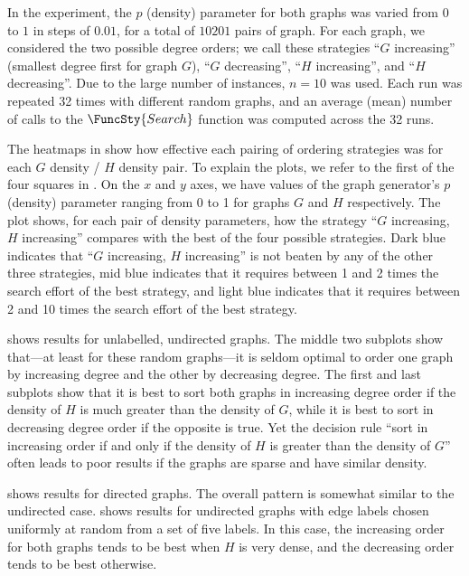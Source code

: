 In the experiment, the $p$ (density) parameter for both graphs was varied from
$0$ to $1$ in steps of $0.01$, for a total of $10201$ pairs of graph.  For each
graph, we considered the two possible degree orders; we call these strategies
``$G$ increasing'' (smallest degree first for graph $G$), ``$G$ decreasing'',
``$H$ increasing'', and ``$H$ decreasing''.  Due to the large number of
instances, $n=10$ was used.  Each run was repeated 32 times with different
random graphs, and an average (mean) number of calls to the $\FuncSty{Search}$
function was computed across the 32 runs.

The heatmaps in  show how effective each pairing of
ordering strategies was for each $G$ density / $H$ density pair.  To explain
the plots, we refer to the first of the four squares in
.  On the $x$ and $y$ axes, we have
values of the graph generator's $p$ (density) parameter ranging from 0 to 1 for
graphs $G$ and $H$ respectively.  The plot shows, for each pair of density
parameters, how the strategy ``$G$ increasing, $H$ increasing'' compares with
the best of the four possible strategies.  Dark blue indicates that ``$G$
increasing, $H$ increasing'' is not beaten by any of the other three
strategies, mid blue indicates that it requires between 1 and 2 times the
search effort of the best strategy, and light blue indicates that it requires
between 2 and 10 times the search effort of the best strategy.

 shows results for unlabelled, undirected graphs.
The middle two subplots show that---at least for these random graphs---it
is seldom optimal to order one graph by increasing degree and the other
by decreasing degree.
The first and last subplots show that it is best to sort both graphs in increasing degree
order if the density of $H$ is much greater than the density of $G$, while
it is best to sort in decreasing degree order if the opposite is true.  Yet the
decision rule ``sort in increasing order if and only if the density of $H$ is
greater than the density of $G$'' often leads to poor results if the graphs are
sparse and have similar density.

 shows results for directed graphs. The overall
pattern is somewhat similar to the undirected case.  
 shows results for undirected graphs with
edge labels chosen uniformly at random from a set of five labels.  In this
case, the increasing order for both graphs tends to be best when $H$ is
very dense, and the decreasing order tends to be best otherwise.

